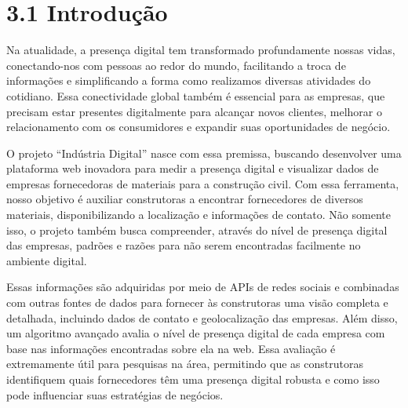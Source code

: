 \hypertarget{__RefHeading___Toc4769_3118176633}{}
\section*{3.1 Introdução}
\label{ages-ii:text-h-0040}

\indent \originaltab{}Na atualidade, a presença digital tem transformado profundamente nossas vidas, conectando-nos com pessoas ao redor do mundo, facilitando a troca de informações e simplificando a forma como realizamos diversas atividades do cotidiano. Essa conectividade global também é essencial para as empresas, que precisam estar presentes digitalmente para alcançar novos clientes, melhorar o relacionamento com os consumidores e expandir suas oportunidades de negócio.\par

\indent \originaltab{}O projeto “Indústria Digital” nasce com essa premissa, buscando desenvolver uma plataforma web inovadora para medir a presença digital e visualizar dados de empresas fornecedoras de materiais para a construção civil. Com essa ferramenta, nosso objetivo é auxiliar construtoras a encontrar fornecedores de diversos materiais, disponibilizando a localização e informações de contato. Não somente\originalspace{} isso, o projeto também busca compreender, através do nível de presença digital das empresas, padrões e razões para não serem encontradas facilmente no ambiente digital.\par

\indent \originaltab{}Essas informações são adquiridas por meio de APIs de redes sociais e combinadas com outras fontes de dados para fornecer às construtoras uma visão completa e detalhada, incluindo dados de contato e geolocalização das empresas. Além disso, um algoritmo avançado avalia o nível de presença digital de cada empresa com base nas informações encontradas sobre ela na web. Essa avaliação é extremamente útil para pesquisas na área, permitindo que as construtoras identifiquem quais fornecedores têm uma presença digital robusta e como isso pode influenciar suas estratégias de negócios.\par

